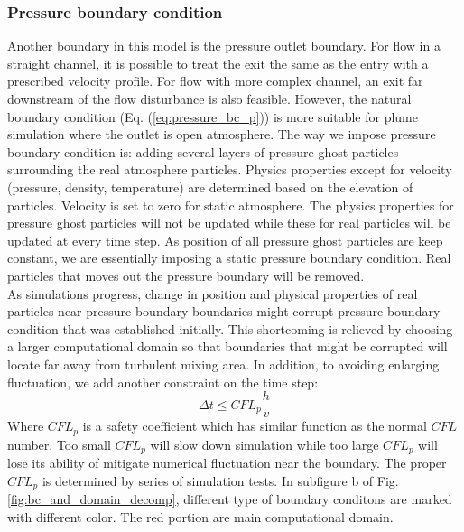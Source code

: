\documentclass[journal abbreviation, manuscript]{copernicus}
\begin{document}
\subsubsection{Pressure boundary condition}
Another boundary in this model is the pressure outlet boundary. For flow in a straight channel, it is possible to treat the exit the same as the entry with a prescribed velocity profile. For flow with more complex channel, an exit far downstream of the flow disturbance is also feasible. However, the natural boundary condition (Eq.  (\ref{eq:pressure_bc_p})) is more suitable for plume simulation where the outlet is open atmosphere. The way we impose pressure boundary condition is: adding several layers of pressure ghost particles surrounding the real atmosphere particles. Physics properties except for velocity (pressure, density, temperature) are determined based on the elevation of particles. Velocity is set to zero for static atmosphere. The physics properties for pressure ghost particles will not be updated while these for real particles will be updated at every time step. As position of all pressure ghost particles are keep constant, we are essentially imposing a static pressure boundary condition. Real particles that moves out the pressure boundary will be removed.\\
As simulations progress, change in position and physical properties of real particles near pressure boundary boundaries might corrupt pressure boundary condition that was established initially. This shortcoming is relieved by choosing a larger computational domain so that boundaries that might be corrupted will locate far away from turbulent mixing area. In addition, to avoiding enlarging fluctuation, we add another constraint on the time step: 
\begin{equation}
\Delta t \leq CFL_p \dfrac{h}{v}
\end{equation}
Where $CFL_p$ is a safety coefficient which has similar function as the normal $CFL$ number. Too small $CFL_p$ will slow down simulation while too large $CFL_p$ will lose its ability of mitigate numerical fluctuation near the boundary. The proper $CFL_p$ is determined by series of simulation tests. 
In subfigure b of Fig. \ref{fig:bc_and_domain_decomp}, different type of boundary conditons are marked with different color. The red portion are main computational domain. 
\end{document}
